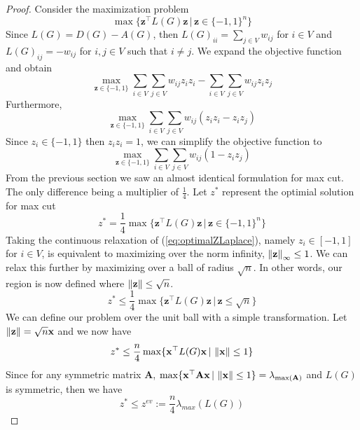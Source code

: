 \documentclass[12pt]{article}
\theoremstyle{plain}
\theoremstyle{definition}
\begin{document}
\begin{proof}
    Consider the maximization problem 
    \[
    \max\lbrace \mathbf{z}^\top L(G) \mathbf{z}\,|\,\mathbf{z} \in \lbrace -1,1 \rbrace^n  \rbrace
    \]
    Since $L(G) = D(G) - A(G)$, then $L(G)_{ii} = \sum_{j\in V} w_{ij}$ for $i \in V$ and $L(G)_{ij} = -w_{ij}$ for $i,j \in V$ such that $i \neq j$. We expand the objective function and obtain
    \[
        \max_{\mathbf{z} \in \lbrace -1,1 \rbrace} \sum_{i \in V}\sum_{j \in V} w_{ij} z_i z_i - \sum_{i \in V}\sum_{j \in V} w_{ij}z_i z_j
    \]
    Furthermore,
    \[
        \max_{\mathbf{z} \in \lbrace -1,1 \rbrace} \sum_{i \in V} \sum_{j \in V} w_{ij} (z_i z_i - z_i z_j) 
    \]
    Since $z_i \in \lbrace -1, 1 \rbrace$ then $z_i z_i=1$, we can simplify the objective function to
    \[
        \max_{\mathbf{z} \in \lbrace -1,1 \rbrace} \sum_{i \in V} \sum_{j \in V} w_{ij} (1- z_i z_j)
    \]
    From the previous section we saw an almost identical formulation for max cut. The only difference being a multiplier of $\frac{1}{4}$. Let $z^*$ represent the optimial solution for max cut
    \begin{equation}\label{eq:optimalZLaplace}
        z^* = \frac{1}{4} \max \lbrace \mathbf{z}^\top L(G) \mathbf{z} \,|\, \mathbf{z} \in \lbrace -1,1 \rbrace^n \rbrace
    \end{equation}
    Taking the continuous relaxation of (\ref{eq:optimalZLaplace}), namely $z_i \in \left[-1,1 \right]$ for $i \in V$, is equivalent to maximizing
    over the norm infinity, $\left\lVert\mathbf{z}\right\rVert_\infty \leq 1$. We can relax this further by maximizing over a ball of radius $\sqrt{n}$. In other words,
    our region is now defined where $\left\lVert\mathbf{z}\right\rVert \leq \sqrt{n}$. 
    \begin{equation}
    z^* \leq \frac{1}{4} \max \lbrace \mathbf{z}^\top L(G) \mathbf{z} \,|\, \mathbf{z} \leq \sqrt{n} \rbrace
    \end{equation}    
    We can define our problem over the unit ball with a simple transformation. Let $\left\lVert\mathbf{z}\right\rVert = \sqrt{n} \mathbf{x}$ and
    we now have
    \begin{equation}
        z^* \leq \frac{n}{4} \max \lbrace \mathbf{x}^\top L(G) \mathbf{x} \,|\, \left\lVert\mathbf{x}\right\rVert \leq 1 \rbrace
    \end{equation}  
    Since for any symmetric matrix $\mathbf{A}$, $\max\lbrace \mathbf{x}^\top \mathbf{A} \mathbf{x}\,|\, \left\lVert\mathbf{x}\right\rVert \leq 1 \rbrace = \lambda_{\max(\mathbf{A})}$ 
    and $L(G)$ is symmetric, then we have 
    \begin{equation}
    z^* \leq z^{ev} := \dfrac{n}{4} \lambda_{max}(L(G))
    \end{equation}
\end{proof}
\end{document}
